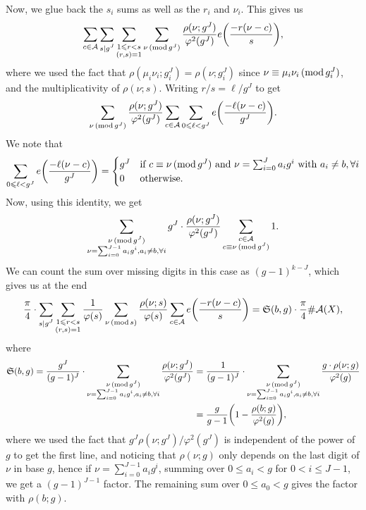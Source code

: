 \documentclass[12pt]{amsart}
\theoremstyle{definition}
\theoremstyle{definition}
\theoremstyle{remark}
\numberwithin{equation}{section}
\newcommand{\CA}{\mathcal{A}}
\renewcommand{\leq}{\leqslant}
\renewcommand{\mod}[1]{\,({\rm mod}\,#1)}
\begin{document}
Now, we glue back the $s_i$ sums as well as the $r_i$ and $\nu_i$. This gives us
$$ \sum_{c\in \CA} \sum_{\substack{s|g^J}} \sum_{\substack{1\leq r < s\\ (r,s)=1}} \sum_{\nu \mod{g^J}} \frac{\rho(\nu;g^J)}{\varphi^2(g^J)} e\bigg( \frac{-r(\nu-c)}{s} \bigg), $$
where we used the fact that $\rho(\mu_i\nu_i;g_i^J)=\rho(\nu;g_i^J)$ since $\nu\equiv \mu_i\nu_i \mod{g_i^J}$, and the multiplicativity of $\rho(\nu;s)$.
Writing $r/s=\ell/g^J$ to get
$$\sum_{\nu \mod{g^J}}\frac{\rho(\nu;g^J)}{\varphi^2(g^J)} \sum_{c\in \CA} \sum_{0\leq \ell <g^J}e\bigg(\frac{-\ell (\nu-c)}{g^J} \bigg) .$$
We note that
$$ \sum_{0\leq \ell <g^J}e\bigg(\frac{-\ell (\nu-c)}{g^J} \bigg) = \begin{cases}
    g^J & \text{if } c\equiv \nu \mod{g^J} \text{ and } \nu=\sum_{i=0}^Ja_ig^i \text{ with } a_i\not=b ,\forall i \\
    0 & \text{otherwise}.
\end{cases} $$
Now, using this identity, we get
$$ \sum_{\substack{\nu \mod{g^J} \\ \nu=\sum_{i=0}^{J-1} a_ig^i , a_i\not=b, \forall i}} g^J \cdot \frac{\rho(\nu;g^J)}{\varphi^2(g^J)} \sum_{\substack{c\in \CA \\ c\equiv \nu \mod{g^J}}} 1 .$$
We can count the sum over missing digits in this case as $(g-1)^{k-J}$, which gives us at the end
\begin{equation}\label{major_arc_main_term}
 \frac{\pi}{4} \cdot \sum_{\substack{s| g^J}}  \sum_{\substack{1\leq r < s\\ (r,s)=1}} \frac{1}{\varphi(s)} \sum_{\nu \mod s} \frac{\rho(\nu; s)}{\varphi(s)} \sum_{c\in \CA}e\bigg(\frac{-r(\nu-c)}{s} \bigg)= \mathfrak{S}(b,g) \cdot \frac{\pi}{4} \#\CA(X) ,
\end{equation}
where
\begin{align*}
\mathfrak{S}(b,g) = \frac{g^J}{(g-1)^J} \cdot \sum_{\substack{\nu \mod{g^J} \\ \nu=\sum_{i=0}^{J-1} a_ig^i , a_i\not=b,\forall i}} \frac{\rho(\nu;g^J)}{\varphi^2(g^J)} &= \frac{1}{(g-1)^J} \cdot \sum_{\substack{\nu \mod{g^J} \\ \nu=\sum_{i=0}^{J-1} a_ig^i , a_i\not=b,\forall i}} \frac{g \cdot \rho(\nu;g)}{\varphi^2(g)} \\
&= \frac{g}{g-1} \bigg( 1 - \frac{\rho(b;g)}{\varphi^2(g)} \bigg),
\end{align*}
where we used the fact that $g^J\rho(\nu;g^J)/\varphi^2(g^J)$ is independent of the power of $g$ to get the first line, and noticing that $\rho(\nu;g)$ only depends on the last digit of $\nu$ in base $g$, hence if $\nu=\sum_{i=0}^{J-1} a_i g^i$, summing over $0\leq a_i<g$ for $0<i\leq J-1$, we get a $(g-1)^{J-1}$ factor. The remaining sum over $0\leq a_0<g$ gives the factor with $\rho(b;g)$.
\end{document}
